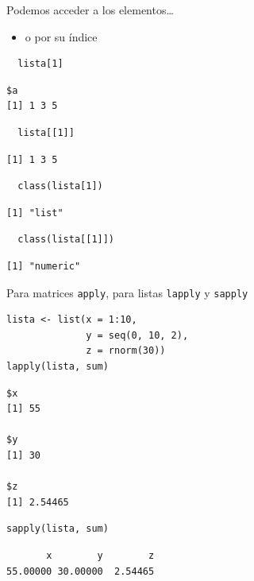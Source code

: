 \documentclass[xcolor={usenames,svgnames,dvipsnames}]{beamer}
\begin{document}
\begin{frame}[fragile,label=sec-3-1-3]{Podemos acceder a los elementos\ldots{}}
 \begin{itemize}
\item o por su índice
\end{itemize}
\lstset{language=R,label= ,caption= ,numbers=none}
\begin{lstlisting}
  lista[1]
\end{lstlisting}

\begin{verbatim}
$a
[1] 1 3 5
\end{verbatim}

\lstset{language=R,label= ,caption= ,numbers=none}
\begin{lstlisting}
  lista[[1]]
\end{lstlisting}

\begin{verbatim}
[1] 1 3 5
\end{verbatim}

\lstset{language=R,label= ,caption= ,numbers=none}
\begin{lstlisting}
  class(lista[1])
\end{lstlisting}

\begin{verbatim}
[1] "list"
\end{verbatim}

\lstset{language=R,label= ,caption= ,numbers=none}
\begin{lstlisting}
  class(lista[[1]])
\end{lstlisting}

\begin{verbatim}
[1] "numeric"
\end{verbatim}
\end{frame}

\begin{frame}[fragile,label=sec-3-1-4]{Para matrices \texttt{apply}, para listas \texttt{lapply} y \texttt{sapply}}
 \lstset{language=R,label= ,caption= ,numbers=none}
\begin{lstlisting}
lista <- list(x = 1:10,
              y = seq(0, 10, 2),
              z = rnorm(30))
lapply(lista, sum)
\end{lstlisting}

\begin{verbatim}
$x
[1] 55

$y
[1] 30

$z
[1] 2.54465
\end{verbatim}

\lstset{language=R,label= ,caption= ,numbers=none}
\begin{lstlisting}
sapply(lista, sum)
\end{lstlisting}

\begin{verbatim}
       x        y        z 
55.00000 30.00000  2.54465
\end{verbatim}
\end{frame}
\end{document}
